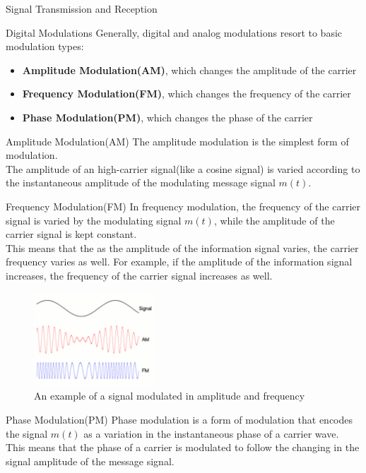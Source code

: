 \begin{section}{Signal Transmission and Reception}
\begin{subsection}{Digital Modulations}
    Generally, digital and analog modulations resort to basic modulation types:
    \begin{itemize}
      \item \textbf{Amplitude Modulation(AM)}, which changes the amplitude of the carrier
      \item \textbf{Frequency Modulation(FM)}, which changes the frequency of the carrier
      \item \textbf{Phase Modulation(PM)}, which changes the phase of the carrier
    \end{itemize}
    \begin{subsubsection}{Amplitude Modulation(AM)}
      The amplitude modulation is the simplest form of modulation.\\
      The amplitude of an high-carrier signal(like a cosine signal) is varied according to the 
      instantaneous amplitude of the modulating message signal $m(t)$.\\
    \end{subsubsection}
    \begin{subsubsection}{Frequency Modulation(FM)}
      In frequency modulation, the frequency of the carrier signal is varied by the modulating
      signal $m(t)$, while the amplitude of the carrier signal is kept constant.\\
      This means that the as the amplitude of the information signal varies, the carrier frequency
      varies as well. For example, if the amplitude of the information signal increases, the
      frequency of the carrier signal increases as well.\\
      \begin{figure}[h]
        \centering
        \includegraphics[width=0.4\textwidth]{img/AM-FM.png}
        \caption{An example of a signal modulated in amplitude and frequency}
        \label{fig:AM-FM}
      \end{figure}
    \end{subsubsection}
    \begin{subsubsection}{Phase Modulation(PM)}
      Phase modulation is a form of modulation that encodes the signal $m(t)$ as a variation in the
      instantaneous phase of a carrier wave.\\
      This means that the phase of a carrier is modulated to follow the changing in the signal 
      amplitude of the message signal.\\


\end{subsubsection}
\end{subsection}
\end{section}
